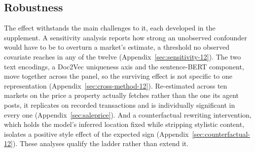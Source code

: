 
\subsection{Robustness}
\label{sec:robustness-body}

The effect withstands the main challenges to it, each developed in the
supplement. A sensitivity analysis reports how strong an unobserved confounder would
have to be to overturn a market's estimate, a threshold no observed covariate
reaches in any of the twelve (Appendix~\ref{sec:sensitivity-12}). The two text
encodings, a Doc2Vec uniqueness axis and the sentence-BERT component, move together
across the panel, so the surviving effect is not specific to one representation
(Appendix~\ref{sec:cross-method-12}). Re-estimated across ten markets on the price a
property actually fetches rather than the one its agent posts, it replicates on
recorded transactions and is individually significant in every one
(Appendix~\ref{sec:saleprice}). And a counterfactual rewriting intervention, which
holds the model's inferred location fixed while stripping stylistic content,
isolates a positive style effect of the expected sign
(Appendix~\ref{sec:counterfactual-12}). These analyses qualify the ladder rather
than extend it.
